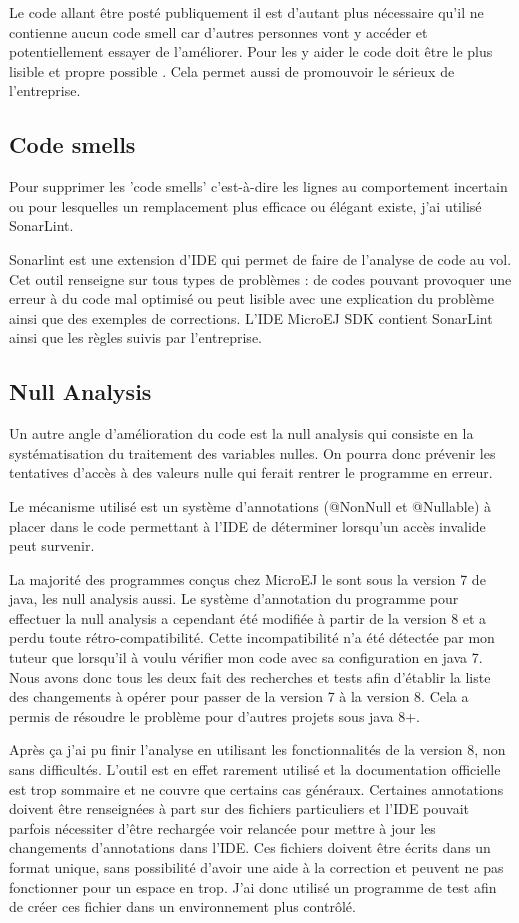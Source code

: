 \documentclass[french,a4paper,12pt]{report}
\begin{document}
Le code allant être posté publiquement il est d’autant plus nécessaire qu’il ne contienne aucun code smell car d’autres personnes vont y accéder et potentiellement essayer de l’améliorer. Pour les y aider le code doit être le plus lisible et propre possible . Cela permet aussi de promouvoir le sérieux de l’entreprise. 

\subsection{Code smells}

Pour supprimer les 'code smells' c'est-à-dire les lignes au comportement incertain ou pour lesquelles un remplacement plus efficace ou élégant existe, j'ai utilisé SonarLint.

Sonarlint est une extension d’IDE qui permet de faire de l’analyse de code au vol. Cet outil renseigne sur tous types de problèmes : de codes pouvant provoquer une erreur à du code mal optimisé ou peut lisible avec une explication du problème ainsi que des exemples de corrections.
L'IDE MicroEJ SDK contient SonarLint ainsi que les règles suivis par l'entreprise.

\subsection{Null Analysis}

Un autre angle d'amélioration du code est la null analysis qui consiste en la systématisation du traitement des variables nulles. On pourra donc prévenir les tentatives d'accès à des valeurs nulle qui ferait rentrer le programme en erreur. 

Le mécanisme utilisé est un système d'annotations (@NonNull et @Nullable) à placer dans le code permettant à l'IDE de déterminer lorsqu'un accès invalide peut survenir. 

La majorité des programmes conçus chez MicroEJ le sont sous la version 7 de java, les null analysis aussi. Le système d'annotation du programme pour effectuer la null analysis a cependant été modifiée à partir de la version 8 et a perdu toute rétro-compatibilité. Cette incompatibilité n'a été détectée par mon tuteur que lorsqu'il à voulu vérifier mon code avec sa configuration en java 7. Nous avons donc tous les deux fait des recherches et tests afin d'établir la liste des changements à opérer pour passer de la version 7 à la version 8. 
Cela a permis de résoudre le problème pour d'autres projets sous java 8+.

Après ça j'ai pu finir l'analyse en utilisant les fonctionnalités de la version 8, non sans difficultés. L’outil est en effet rarement utilisé et la documentation officielle est trop sommaire et ne couvre que certains cas généraux. Certaines annotations doivent être renseignées à part sur des fichiers particuliers et l'IDE pouvait parfois nécessiter d'être rechargée voir relancée pour mettre à jour les changements d'annotations dans l'IDE. Ces fichiers doivent être écrits dans un format unique, sans possibilité d'avoir une aide à la correction et peuvent ne pas fonctionner pour un espace en trop. J'ai donc utilisé un programme de test afin de créer ces fichier dans un environnement plus contrôlé.
\end{document}
